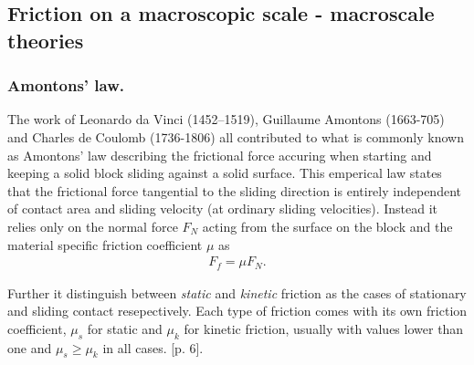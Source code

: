 
\subsection{Friction on a macroscopic scale - macroscale theories}
\subsubsection {Amontons’ law. }
 The work of Leonardo da Vinci (1452–1519), Guillaume Amontons (1663-705) and Charles de Coulomb (1736-1806) all contributed to what is commonly known as  Amontons’ law describing the frictional force accuring when starting and keeping a solid block sliding against a solid surface. This emperical law states that the frictional force tangential to the sliding direction is entirely independent of contact area and sliding velocity (at ordinary sliding velocities). Instead it relies only on the normal force $F_N$ acting from the surface on the block and the material specific friction coefficient $\mu$ as
\begin{align*}
  F_f = \mu F_N.
\end{align*}

Further it distinguish between \textit{static} and \textit{kinetic} friction as the cases of stationary and sliding contact resepectively. Each type of friction comes with its own friction coefficient, $\mu_s$ for static and $\mu_k$ for kinetic friction, usually with values lower than one and $\mu_s \ge \mu_k$ in all cases. \cite{gnecco_meyer_2015}[p. 6]. \\

